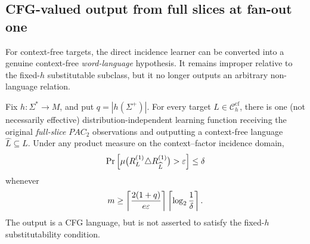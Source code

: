 \subsection{CFG-valued output from full slices at fan-out one}

For context-free targets, the direct incidence learner can be
converted into a genuine context-free \emph{word-language} hypothesis.
It remains improper relative to the fixed-\(h\) substitutable
subclass, but it no longer outputs an arbitrary non-language
relation.

\begin{theorem}
\label{thm:cfg-valued-improper-pac}
Fix \(h:\Sigma^*\to M\), and put \(q=|h(\Sigma^+)|\).
For every target \(L\in\mathcal C_h^{\mathrm{cf}}\),
there is one (not necessarily effective) distribution-independent
learning function receiving the original \emph{full-slice}
\(PAC_2\) observations and outputting a context-free language
\(\widehat L\subseteq L\).  Under any product measure on
the context--factor incidence domain,
\[
 \Pr\left[
  \mu\bigl(R_L^{(1)}\triangle R_{\widehat L}^{(1)}\bigr)
       >\varepsilon\right]\le\delta
\]
whenever
\[
 m\ge
 \left\lceil\frac{2(1+q)}{e\varepsilon}\right\rceil
 \left\lceil\log_2\frac1\delta\right\rceil.
\]
The output is a CFG language, but is not asserted to satisfy
the fixed-\(h\) substitutability condition.
\end{theorem}

